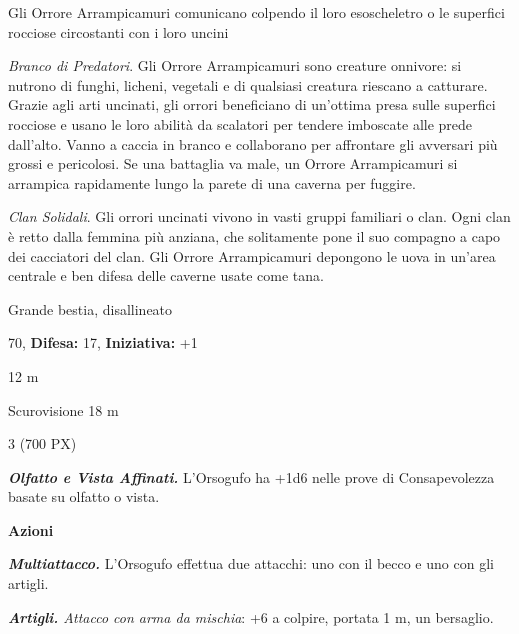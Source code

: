 \begin{multicols}{2}
{Gli Orrore Arrampicamuri comunicano colpendo il loro esoscheletro o le superfici rocciose circostanti con i loro uncini

\emph{Branco di Predatori}. Gli Orrore Arrampicamuri sono creature onnivore: si nutrono di funghi, licheni, vegetali e di qualsiasi creatura riescano a catturare. Grazie agli arti uncinati, gli orrori beneficiano di un'ottima presa sulle superfici rocciose e usano le loro abilità da scalatori per tendere imboscate alle prede dall'alto. Vanno a caccia in branco e collaborano per affrontare gli avversari più grossi e pericolosi. Se una battaglia va male, un Orrore Arrampicamuri si arrampica rapidamente lungo la parete di una caverna per fuggire.

\emph{Clan Solidali}. Gli orrori uncinati vivono in vasti gruppi familiari o clan. Ogni clan è retto dalla femmina più anziana, che solitamente pone il suo compagno a capo dei cacciatori del clan. Gli Orrore Arrampicamuri depongono le uova in un'area centrale e ben difesa delle caverne usate come tana.

\noindent
\begin{description}[noitemsep, topsep=0pt, parsep=0pt, partopsep=0pt, leftmargin=0cm, labelwidth=2.2cm]
	\item[\textbf{Taglia/Tipo:}] Grande bestia, disallineato
	\item[\textbf{Caratt.:}] 
	\item[\textbf{Punti Ferita:}] 70,  \textbf{Difesa:} 17,  \textbf{Iniziativa:} +1
	\item[\textbf{Movimento:}] 12 m
	\item[\textbf{Tiri Salvez.:}] 
	\item[\textbf{Sensi:}] Scurovisione 18 m
	\item[\textbf{Sfida:}] 3 (700 PX)\smallskip
\end{description}

\emph{\textbf{Olfatto e Vista Affinati.}} L'Orsogufo ha +1d6 nelle prove di Consapevolezza basate su olfatto o vista.

\textbf{Azioni}

\emph{\textbf{Multiattacco.}} L'Orsogufo effettua due attacchi: uno con il becco e uno con gli artigli.

\emph{\textbf{Artigli.} Attacco con arma da mischia}: +6 a colpire, portata 1 m, un bersaglio.

}
\end{multicols}
